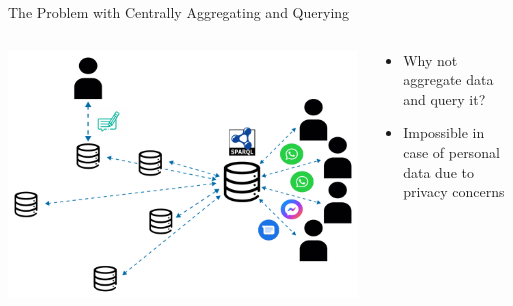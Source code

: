 \begin{frame}{The Problem with Centrally Aggregating and Querying}
    \begin{columns}[T] %
        \begin{column}{0.6\textwidth} %
            \includegraphics[width=\linewidth]{images/centralize-personal-data-stores.pdf} %
        \end{column}

        \begin{column}{0.4\textwidth} %
            \begin{itemize}
                \item Why not aggregate data and query it?
                \item Impossible in case of personal data due to privacy concerns
            \end{itemize}
        \end{column}
    \end{columns}
\end{frame}

